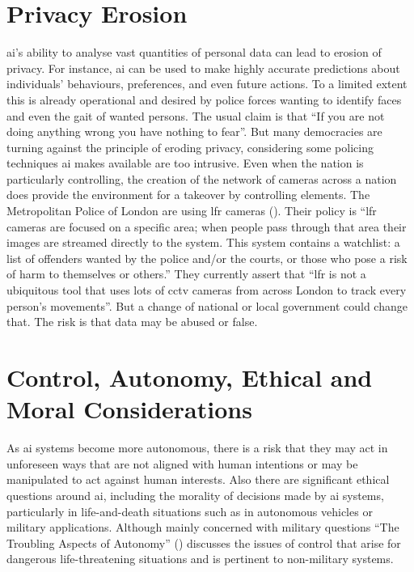 \section{Privacy Erosion}
\gls{ai}'s ability to analyse vast quantities of personal data can lead to erosion of privacy. For instance, \gls{ai} can be used to make highly accurate predictions about individuals’ behaviours, preferences, and even future actions. To a limited extent this is already operational and desired by police forces wanting to identify faces and even the gait of wanted persons. The usual claim is that ``If you are not doing anything wrong you have nothing to fear''. But many democracies are turning against the principle of eroding privacy, considering some policing techniques \gls{ai} makes available are too intrusive. Even when the nation is particularly controlling, the creation of the network of cameras across a nation does provide the environment for a takeover by controlling elements. The Metropolitan Police  of London are using \gls{lfr} cameras (\cite{citation:police2025}). Their policy is ``\Gls{lfr} cameras are focused on a specific area; when people pass through that area their images are streamed directly to the  system. This system contains a watchlist: a list of offenders wanted by the police and/or the courts, or those who pose a risk of harm to themselves or others.''  They currently assert that ``\gls{lfr} is not a ubiquitous tool that uses lots of \gls{cctv} cameras from across London to track every person’s movements''.  But a change of national or local government could change that. The risk is that data may be abused or false.

\section{Control, Autonomy, Ethical and Moral Considerations}
As \gls{ai} systems become more autonomous, there is a risk that they may act in unforeseen ways that are not aligned with human intentions or may be manipulated to act against human interests. Also there are significant ethical questions around \gls{ai}, including the morality of decisions made by \gls{ai} systems, particularly in life-and-death situations such as in autonomous vehicles or military applications. Although mainly concerned with military questions  “The Troubling Aspects of Autonomy” (\cite{citation:SCSC152}) discusses the issues of control that arise for dangerous life-threatening situations and is pertinent to non-military systems.

